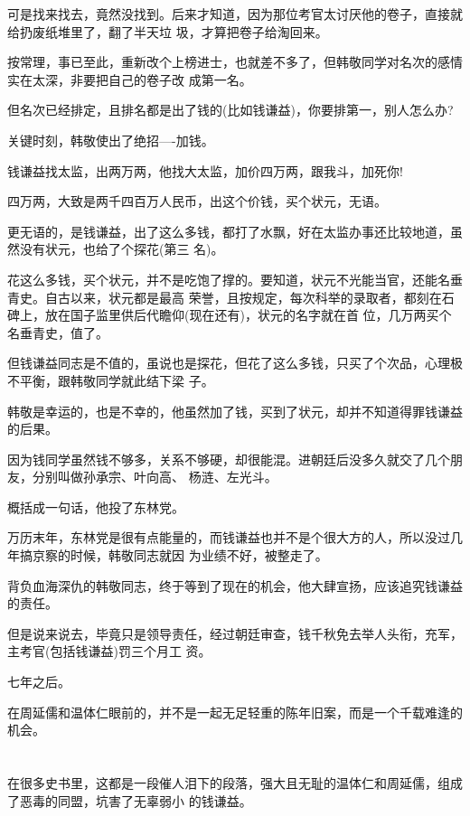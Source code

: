 \documentclass[11pt,a4paper,onecolumn]{article}
\begin{document}
可是找来找去，竟然没找到。后来才知道，因为那位考官太讨厌他的卷子，直接就给扔废纸堆里了，翻了半天垃
圾，才算把卷子给淘回来。

按常理，事已至此，重新改个上榜进士，也就差不多了，但韩敬同学对名次的感情实在太深，非要把自己的卷子改
成第一名。

但名次已经排定，且排名都是出了钱的(比如钱谦益)，你要排第一，别人怎么办?

关键时刻，韩敬使出了绝招----加钱。

钱谦益找太监，出两万两，他找大太监，加价四万两，跟我斗，加死你!

四万两，大致是两千四百万人民币，出这个价钱，买个状元，无语。

更无语的，是钱谦益，出了这么多钱，都打了水飘，好在太监办事还比较地道，虽然没有状元，也给了个探花(第三
名)。

花这么多钱，买个状元，并不是吃饱了撑的。要知道，状元不光能当官，还能名垂青史。自古以来，状元都是最高
荣誉，且按规定，每次科举的录取者，都刻在石碑上，放在国子监里供后代瞻仰(现在还有)，状元的名字就在首
位，几万两买个名垂青史，值了。

但钱谦益同志是不值的，虽说也是探花，但花了这么多钱，只买了个次品，心理极不平衡，跟韩敬同学就此结下梁
子。

韩敬是幸运的，也是不幸的，他虽然加了钱，买到了状元，却并不知道得罪钱谦益的后果。

因为钱同学虽然钱不够多，关系不够硬，却很能混。进朝廷后没多久就交了几个朋友，分别叫做孙承宗、叶向高、
杨涟、左光斗。

概括成一句话，他投了东林党。

万历末年，东林党是很有点能量的，而钱谦益也并不是个很大方的人，所以没过几年搞京察的时候，韩敬同志就因
为业绩不好，被整走了。

背负血海深仇的韩敬同志，终于等到了现在的机会，他大肆宣扬，应该追究钱谦益的责任。

但是说来说去，毕竟只是领导责任，经过朝廷审查，钱千秋免去举人头衔，充军，主考官(包括钱谦益)罚三个月工
资。

七年之后。

在周延儒和温体仁眼前的，并不是一起无足轻重的陈年旧案，而是一个千载难逢的机会。

\section[\thesection]{}

在很多史书里，这都是一段催人泪下的段落，强大且无耻的温体仁和周延儒，组成了恶毒的同盟，坑害了无辜弱小
的钱谦益。
\end{document}
